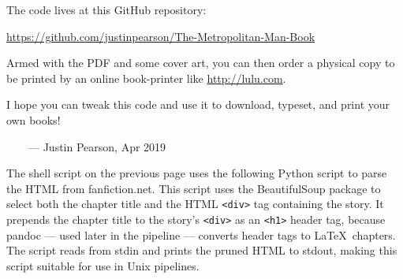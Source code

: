 \documentclass[ebook,12pt]{memoir}
\begin{document}
The code lives at this GitHub repository:

\noindent \url{https://github.com/justinpearson/The-Metropolitan-Man-Book}

Armed with the PDF and some cover art, you can then order a physical copy to be printed by 
an online book-printer like \url{http://lulu.com}.

I hope you can tweak this code and use it to download, typeset, 
and print your own books!

\ \ \ \ --- Justin Pearson, Apr 2019

\normalsize
\cleartoverso


\thispagestyle{empty}



\tiny



\normalsize
\clearpage


\thispagestyle{empty}

\footnotesize
\noindent The shell script on the previous page uses the following Python script 
to parse the HTML from fanfiction.net. This script uses the BeautifulSoup package to
select both the chapter title and the HTML \texttt{<div>} tag containing
the story. It prepends the chapter title to the story's \texttt{<div>}
as an \texttt{<h1>} header tag, because pandoc --- used later in the pipeline --- 
converts header tags to \LaTeX\ chapters. 
The script reads from stdin and prints the pruned HTML to stdout, making this script suitable 
for use in Unix pipelines. 

\vspace{.5cm}

\tiny



\normalsize
\cleartorecto


\tableofcontents*  %

\mainmatter         %
\end{document}
